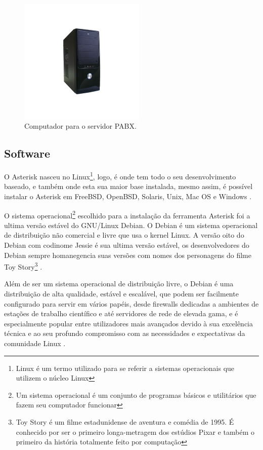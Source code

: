\begin{figure}[h]
	\centering
	\includegraphics[width=6cm]{imagens/gabinete.jpg}
	\caption{Computador para o servidor PABX.}
    \label{Figura18}
\end{figure}

\subsection{Software}
O Asterisk nasceu no Linux\footnote{Linux é um termo utilizado para se referir a sistemas operacionais que utilizem o núcleo Linux}, logo, é onde tem todo o seu desenvolvimento baseado, e também onde esta sua maior base instalada, mesmo assim, é possível instalar o Asterisk em FreeBSD, OpenBSD, Solaris, Unix, Mac OS e Windows \cite{flavioeduardoandredade2005}.

O sistema operacional\footnote{Um sistema operacional é um conjunto de programas básicos e utilitários que fazem seu computador funcionar} escolhido para a instalação da ferramenta Asterisk foi a ultima versão estável do GNU/Linux Debian. O Debian é um sistema operacional de distribuição não comercial e livre que usa o kernel Linux. A versão oito do Debian com codinome Jessie é sua ultima versão estável, os desenvolvedores do Debian sempre homanegencia suas versões com nomes dos personagens do filme Toy Story\footnote{Toy Story é um filme estadunidense de aventura e comédia de 1995. É conhecido por ser o primeiro longa-metragem dos estúdios Pixar e também o primeiro da história totalmente feito por computação} \cite{valessiosoaresbrito2015}.

Além de ser um sistema operacional de distribuição livre, o Debian é uma distribuição de alta qualidade, estável e escalável, que podem ser facilmente configurado para servir em vários papéis, desde firewalls dedicadas a ambientes de estações de trabalho científico e até servidores de rede de elevada gama, e é especialmente popular entre utilizadores mais avançados devido à sua excelência técnica e ao seu profundo compromisso com as necessidades e expectativas da comunidade Linux \cite{valessiosoaresbrito2015}.

